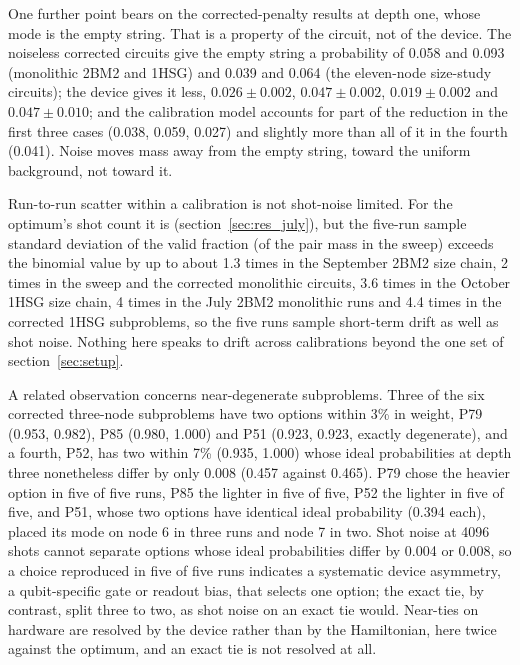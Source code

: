 \documentclass{iopjournal}
\begin{document}
One further point bears on the corrected-penalty results at depth one, whose mode is the empty string. That is a property of the circuit, not of the device. The noiseless corrected circuits give the empty string a probability of 0.058 and 0.093 (monolithic 2BM2 and 1HSG) and 0.039 and 0.064 (the eleven-node size-study circuits); the device gives it less, $0.026 \pm 0.002$, $0.047 \pm 0.002$, $0.019 \pm 0.002$ and $0.047 \pm 0.010$; and the calibration model accounts for part of the reduction in the first three cases (0.038, 0.059, 0.027) and slightly more than all of it in the fourth (0.041). Noise moves mass away from the empty string, toward the uniform background, not toward it.

Run-to-run scatter within a calibration is not shot-noise limited. For the optimum's shot count it is (section~\ref{sec:res_july}), but the five-run sample standard deviation of the valid fraction (of the pair mass in the sweep) exceeds the binomial value by up to about 1.3 times in the September 2BM2 size chain, 2 times in the sweep and the corrected monolithic circuits, 3.6 times in the October 1HSG size chain, 4 times in the July 2BM2 monolithic runs and 4.4 times in the corrected 1HSG subproblems, so the five runs sample short-term drift as well as shot noise. Nothing here speaks to drift across calibrations beyond the one set of section~\ref{sec:setup}.

A related observation concerns near-degenerate subproblems. Three of the six corrected three-node subproblems have two options within 3\% in weight, P79 (0.953, 0.982), P85 (0.980, 1.000) and P51 (0.923, 0.923, exactly degenerate), and a fourth, P52, has two within 7\% (0.935, 1.000) whose ideal probabilities at depth three nonetheless differ by only 0.008 (0.457 against 0.465). P79 chose the heavier option in five of five runs, P85 the lighter in five of five, P52 the lighter in five of five, and P51, whose two options have identical ideal probability (0.394 each), placed its mode on node 6 in three runs and node 7 in two. Shot noise at 4096 shots cannot separate options whose ideal probabilities differ by 0.004 or 0.008, so a choice reproduced in five of five runs indicates a systematic device asymmetry, a qubit-specific gate or readout bias, that selects one option; the exact tie, by contrast, split three to two, as shot noise on an exact tie would. Near-ties on hardware are resolved by the device rather than by the Hamiltonian, here twice against the optimum, and an exact tie is not resolved at all.
\end{document}
